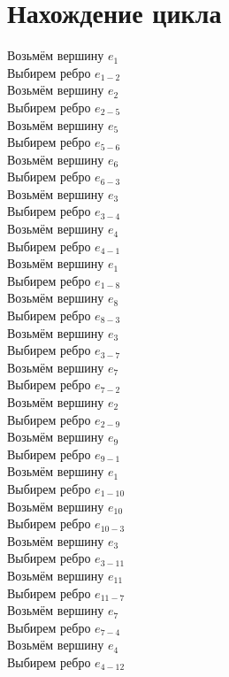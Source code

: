 \documentclass[12pt,a4paper]{report}
\begin{document}
\section*{Нахождение цикла}
Возьмём вершину $e_{1}$ \\
Выбирем ребро $e_{1-2}$ \\
Возьмём вершину $e_{2}$ \\
Выбирем ребро $e_{2-5}$ \\
Возьмём вершину $e_{5}$ \\
Выбирем ребро $e_{5-6}$ \\
Возьмём вершину $e_{6}$ \\
Выбирем ребро $e_{6-3}$ \\
Возьмём вершину $e_{3}$ \\
Выбирем ребро $e_{3-4}$ \\
Возьмём вершину $e_{4}$ \\
Выбирем ребро $e_{4-1}$ \\
Возьмём вершину $e_{1}$ \\
Выбирем ребро $e_{1-8}$ \\
Возьмём вершину $e_{8}$ \\
Выбирем ребро $e_{8-3}$ \\
Возьмём вершину $e_{3}$ \\
Выбирем ребро $e_{3-7}$ \\
Возьмём вершину $e_{7}$ \\
Выбирем ребро $e_{7-2}$ \\
Возьмём вершину $e_{2}$ \\
Выбирем ребро $e_{2-9}$ \\
Возьмём вершину $e_{9}$ \\
Выбирем ребро $e_{9-1}$ \\
Возьмём вершину $e_{1}$ \\
Выбирем ребро $e_{1-10}$ \\
Возьмём вершину $e_{10}$ \\
Выбирем ребро $e_{10-3}$ \\
Возьмём вершину $e_{3}$ \\
Выбирем ребро $e_{3-11}$ \\
Возьмём вершину $e_{11}$ \\
Выбирем ребро $e_{11-7}$ \\
Возьмём вершину $e_{7}$ \\
Выбирем ребро $e_{7-4}$ \\
Возьмём вершину $e_{4}$ \\
Выбирем ребро $e_{4-12}$ \\
\end{document}
